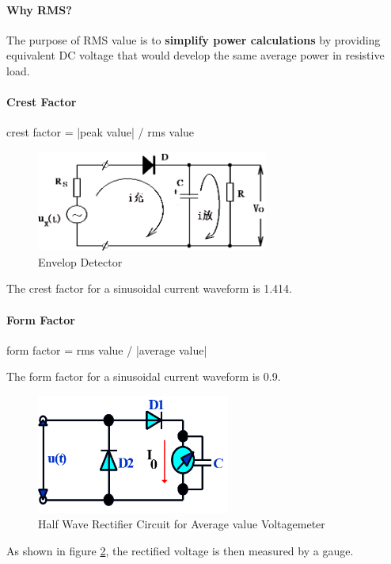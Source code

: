 \paragraph{Why RMS?} The purpose of RMS value is to \textbf{simplify power calculations} by providing equivalent DC voltage that would develop the same average power in resistive load.

\paragraph{Crest Factor} crest factor = |peak value| / rms value

\begin{figure}
  \centering
  \includegraphics[width=3.0in]{fig/fig_envelop_detector.png}
  \caption{Envelop Detector}\label{fig_envelop_detector}
\end{figure}

The crest factor for a sinusoidal current waveform is 1.414.

\paragraph{Form Factor} form factor = rms value / |average value|

The form factor for a sinusoidal current waveform is 0.9.

\begin{figure}
  \centering
  \includegraphics[width=2.5in]{fig/fig_rectified_voltmeter.png}
  \caption{Half Wave Rectifier Circuit for Average value Voltagemeter}\label{fig_rectified_voltagemeter}
\end{figure}

As shown in figure \ref{fig_rectified_voltagemeter}, the rectified voltage is then measured by a gauge.

